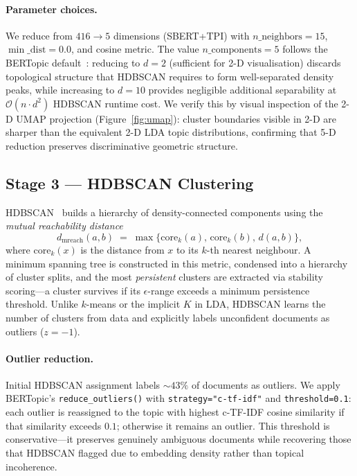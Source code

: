 \documentclass[10pt,twocolumn,a4paper]{article}
\begin{document}
\paragraph{Parameter choices.} We reduce from $416 \rightarrow 5$ dimensions (SBERT+TPI) with $n\_\text{neighbors}{=}15$, $\min\_\text{dist}{=}0.0$, and cosine metric. The value $n\_\text{components} = 5$ follows the BERTopic default~\cite{grootendorst2022}: reducing to $d=2$ (sufficient for 2-D visualisation) discards topological structure that HDBSCAN requires to form well-separated density peaks, while increasing to $d=10$ provides negligible additional separability at $\mathcal{O}(n \cdot d^2)$ HDBSCAN runtime cost. We verify this by visual inspection of the 2-D UMAP projection (Figure~\ref{fig:umap}): cluster boundaries visible in 2-D are sharper than the equivalent 2-D LDA topic distributions, confirming that 5-D reduction preserves discriminative geometric structure.

\subsection{Stage 3 --- HDBSCAN Clustering}
\label{sec:hdbscan}

HDBSCAN~\cite{campello2013} builds a hierarchy of density-connected components using the \emph{mutual reachability distance}
\begin{equation}
\label{eq:mrd}
d_{\text{mreach}}(a,b) \;=\; \max\bigl\{\text{core}_k(a),\,\text{core}_k(b),\,d(a,b)\bigr\},
\end{equation}
where $\text{core}_k(x)$ is the distance from $x$ to its $k$-th nearest neighbour. A minimum spanning tree is constructed in this metric, condensed into a hierarchy of cluster splits, and the most \emph{persistent} clusters are extracted via stability scoring---a cluster survives if its $\epsilon$-range exceeds a minimum persistence threshold. Unlike $k$-means or the implicit $K$ in LDA, HDBSCAN learns the number of clusters from data and explicitly labels unconfident documents as outliers ($z = -1$).

\paragraph{Outlier reduction.} Initial HDBSCAN assignment labels $\sim 43\%$ of documents as outliers. We apply BERTopic's \texttt{reduce\_outliers()} with \texttt{strategy="c-tf-idf"} and \texttt{threshold=0.1}: each outlier is reassigned to the topic with highest c-TF-IDF cosine similarity if that similarity exceeds $0.1$; otherwise it remains an outlier. This threshold is conservative---it preserves genuinely ambiguous documents while recovering those that HDBSCAN flagged due to embedding density rather than topical incoherence.
\end{document}
